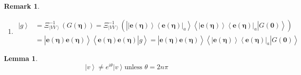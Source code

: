 \documentclass[aps,preprint]{revtex4}%
\newtheorem{lemma}[theorem]{Lemma}
\newtheorem{remark}[theorem]{Remark}
\begin{document}
\begin{remark}
\begin{enumerate}
\item
\begin{align}
\left\vert g\right\rangle  &  =\mathcal{\Xi}_{\left\vert VV\right\rangle
}^{-1}\left(  G\mathbf{\left(  \mathbf{\eta}\right)  }\right)  =\mathcal{\Xi
}_{\left\vert VV\right\rangle }^{-1}\left(  \overset{}{\left\vert
\overset{}{\left\vert \mathbf{e}\left(  \mathbf{\eta}\right)  \right\rangle
\left\langle \mathbf{e}\left(  \mathbf{\eta}\right)  \right\vert _{a}%
}\right\rangle \left\langle \left.  \overset{}{\left\vert \mathbf{e}\left(
\mathbf{\eta}\right)  \right\rangle \left\langle \mathbf{e}\left(
\mathbf{\eta}\right)  \right\vert }_{a}\right\vert \overset{}{G}\left(
\mathbf{0}\right)  \right\rangle }\right) \\
&  =\left\vert \overset{}{\mathbf{e\left(  \mathbf{\eta}\right)  e}\left(
\mathbf{\eta}\right)  }\right\rangle \left\langle \left.
\overset{}{\mathbf{e\left(  \mathbf{\eta}\right)  e}\left(  \mathbf{\eta
}\right)  }\right\vert \overset{}{g}\right\rangle =\left\vert
\overset{}{\mathbf{e\left(  \mathbf{\eta}\right)  e}\left(  \mathbf{\eta
}\right)  }\right\rangle \left\langle \left.  \overset{}{\left\vert
\mathbf{e}\left(  \mathbf{\eta}\right)  \right\rangle \left\langle
\mathbf{e}\left(  \mathbf{\eta}\right)  \right\vert _{a}}\right\vert
\overset{}{G}\left(  \mathbf{0}\right)  \right\rangle
\end{align}

\end{enumerate}
\end{remark}

\begin{lemma}%
\begin{equation}
\left\vert v\right\rangle \neq e^{i\theta}\left\vert v\right\rangle \text{
unless }\theta=2n\pi
\end{equation}

\end{lemma}
\end{document}

